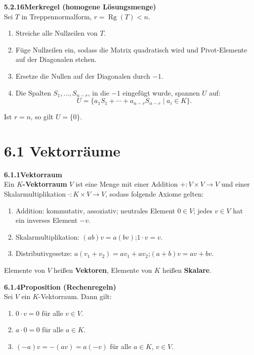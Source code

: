 \documentclass[a4paper,12pt]{article}
\newcommand{\gentry}[3]{%
  \noindent\textbf{#1\quad #2}\nopagebreak\\[0.2em]
  #3\par\smallskip
}
\begin{document}
\gentry{5.2.16}{Merkregel (homogene Lösungsmenge)}{%
  Sei $T$ in Treppennormalform, $r = \operatorname{Rg}(T) < n$.
  \begin{enumerate}[label=\arabic*.,topsep=2pt,itemsep=1pt]
    \item Streiche alle Nullzeilen von $T$.
    \item Füge Nullzeilen ein, sodass die Matrix quadratisch wird und Pivot-Elemente
          auf der Diagonalen stehen.
    \item Ersetze die Nullen auf der Diagonalen durch $-1$.
    \item Die Spalten $S_1,\ldots,S_{n-r}$, in die $-1$ eingefügt wurde, spannen $U$ auf:
          \[U = \{a_1 S_1 + \cdots + a_{n-r} S_{n-r} \mid a_i \in K\}.\]
  \end{enumerate}
  Ist $r = n$, so gilt $U = \{0\}$.
}

\section*{6.1 \quad Vektorräume}

\gentry{6.1.1}{Vektorraum}{%
  Ein \textbf{$K$-Vektorraum} $V$ ist eine Menge mit einer Addition
  $+: V \times V \to V$ und einer Skalarmultiplikation $\cdot: K \times V \to V$,
  sodass folgende Axiome gelten:
  \begin{enumerate}[label=(\roman*),topsep=2pt,itemsep=1pt]
    \item Addition: kommutativ, assoziativ; neutrales Element $0 \in V$;
          jedes $v \in V$ hat ein inverses Element $-v$.
    \item Skalarmultiplikation: $(ab)v = a(bv)$;\quad $1 \cdot v = v$.
    \item Distributivgesetze: $a(v_1+v_2) = av_1+av_2$;\quad $(a+b)v = av+bv$.
  \end{enumerate}
  Elemente von $V$ heißen \textbf{Vektoren}, Elemente von $K$ heißen
  \textbf{Skalare}.
}

\gentry{6.1.4}{Proposition (Rechenregeln)}{%
  Sei $V$ ein $K$-Vektorraum. Dann gilt:
  \begin{enumerate}[label=(\alph*),topsep=2pt,itemsep=1pt]
    \item $0 \cdot v = 0$ für alle $v \in V$.
    \item $a \cdot 0 = 0$ für alle $a \in K$.
    \item $(-a)v = -(av) = a(-v)$ für alle $a \in K$, $v \in V$.
  \end{enumerate}
}
\end{document}
